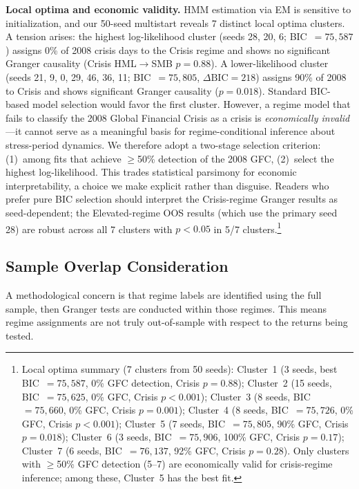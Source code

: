 \documentclass[sigconf,anonymous]{acmart}
\begin{document}
\textbf{Local optima and economic validity.}
HMM estimation via EM is sensitive to initialization, and our 50-seed multistart
reveals 7 distinct local optima clusters.
A tension arises: the highest log-likelihood cluster (seeds 28, 20, 6; BIC~$= 75{,}587$)
assigns 0\% of 2008 crisis days to the Crisis regime and shows no significant
Granger causality (Crisis HML$\to$SMB $p = 0.88$).
A lower-likelihood cluster (seeds 21, 9, 0, 29, 46, 36, 11; BIC~$= 75{,}805$,
$\Delta\text{BIC} = 218$) assigns 90\% of 2008 to Crisis and shows significant
Granger causality ($p = 0.018$).
Standard BIC-based model selection would favor the first cluster.
However, a regime model that fails to classify the 2008 Global Financial Crisis
as a crisis is \emph{economically invalid}---it cannot serve as a meaningful
basis for regime-conditional inference about stress-period dynamics.
We therefore adopt a two-stage selection criterion: (1)~among fits that achieve
$\geq$50\% detection of the 2008 GFC, (2)~select the highest log-likelihood.
This trades statistical parsimony for economic interpretability, a
choice we make explicit rather than disguise.
Readers who prefer pure BIC selection should interpret the Crisis-regime
Granger results as seed-dependent; the Elevated-regime OOS results
(which use the primary seed 28) are robust across all 7 clusters
with $p < 0.05$ in 5/7 clusters.\footnote{Local optima summary (7 clusters from 50 seeds):
Cluster~1 (3 seeds, best BIC~$= 75{,}587$, 0\% GFC detection, Crisis $p = 0.88$);
Cluster~2 (15 seeds, BIC~$= 75{,}625$, 0\% GFC, Crisis $p < 0.001$);
Cluster~3 (8 seeds, BIC~$= 75{,}660$, 0\% GFC, Crisis $p = 0.001$);
Cluster~4 (8 seeds, BIC~$= 75{,}726$, 0\% GFC, Crisis $p < 0.001$);
Cluster~5 (7 seeds, BIC~$= 75{,}805$, 90\% GFC, Crisis $p = 0.018$);
Cluster~6 (3 seeds, BIC~$= 75{,}906$, 100\% GFC, Crisis $p = 0.17$);
Cluster~7 (6 seeds, BIC~$= 76{,}137$, 92\% GFC, Crisis $p = 0.28$).
Only clusters with $\geq$50\% GFC detection (5--7) are economically valid for
crisis-regime inference; among these, Cluster~5 has the best fit.}

\subsection{Sample Overlap Consideration}

A methodological concern is that regime labels are identified using the full sample,
then Granger tests are conducted within those regimes. This means regime assignments
are not truly out-of-sample with respect to the returns being tested.
\end{document}
